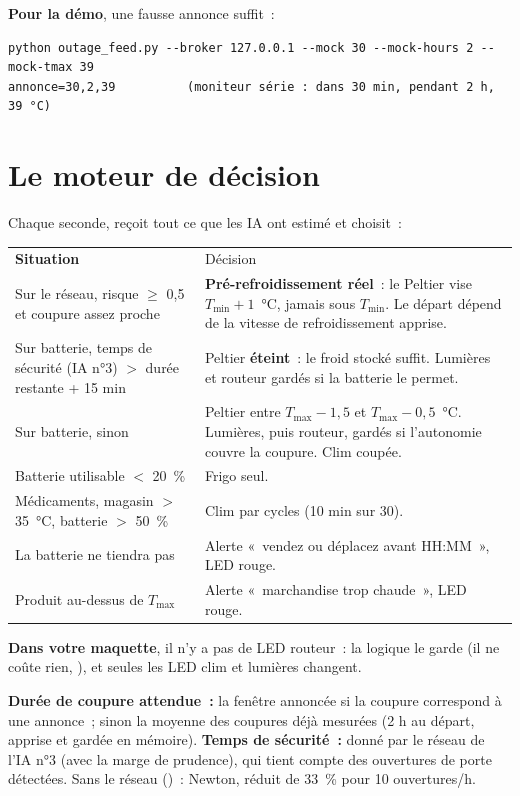 \textbf{Pour la démo}, une fausse annonce suffit~:
\begin{lstlisting}[style=cmd]
python outage_feed.py --broker 127.0.0.1 --mock 30 --mock-hours 2 --mock-tmax 39
annonce=30,2,39          (moniteur série : dans 30 min, pendant 2 h, 39 °C)
\end{lstlisting}

\section{Le moteur de décision}\label{sec:decision}

Chaque seconde,  reçoit tout ce que les IA ont estimé et choisit~:

\begin{tabularx}{\linewidth}{P{5.4cm}L}
 \textbf{Situation} & Décision \\
Sur le réseau, risque $\geq$ 0,5 et coupure assez proche & \textbf{Pré-refroidissement réel}~: le Peltier vise $T_{\min} + 1$~°C, jamais sous $T_{\min}$. Le départ dépend de la vitesse de refroidissement apprise. \\
Sur batterie, temps de sécurité (IA n°3) $>$ durée restante + 15 min & Peltier \textbf{éteint}~: le froid stocké suffit. Lumières et routeur gardés si la batterie le permet. \\
Sur batterie, sinon & Peltier entre $T_{\max} - 1{,}5$ et $T_{\max} - 0{,}5$~°C. Lumières, puis routeur, gardés si l'autonomie couvre la coupure. Clim coupée. \\
Batterie utilisable $<$ 20~\% & Frigo seul. \\
Médicaments, magasin $>$ 35~°C, batterie $>$ 50~\% & Clim par cycles (10 min sur 30). \\
La batterie ne tiendra pas & Alerte «~vendez ou déplacez avant HH:MM~», LED rouge. \\
Produit au-dessus de $T_{\max}$ & Alerte «~marchandise trop chaude~», LED rouge. \\
\end{tabularx}

\textbf{Dans votre maquette}, il n'y a pas de LED routeur~: la logique le garde (il ne coûte rien, ), et seules les LED clim et lumières changent.

\textbf{Durée de coupure attendue~:} la fenêtre annoncée si la coupure correspond à une annonce~; sinon la moyenne des coupures déjà mesurées (2 h au départ, apprise et gardée en mémoire). \textbf{Temps de sécurité~:} donné par le réseau de l'IA n°3 (avec la marge de prudence), qui tient compte des ouvertures de porte détectées. Sans le réseau ()~: Newton, réduit de 33~\% pour 10 ouvertures/h.

